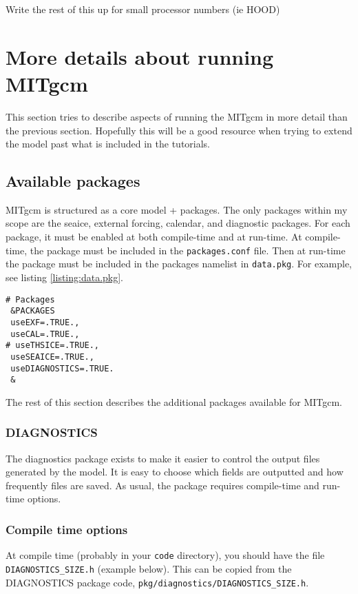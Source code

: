 \documentclass[11pt]{article}
\begin{document}
Write the rest of this up for small processor numbers (ie HOOD)




\section{More details about running MITgcm}
This section tries to describe aspects of running the MITgcm in more detail than the previous section. Hopefully this will be a good resource when trying to extend the model past what is included in the tutorials.

\subsection{Available packages}
MITgcm is structured as a core model + packages. The only packages within my scope are the seaice, external forcing, calendar, and diagnostic packages. For each package, it must be enabled at both compile-time and at run-time. At compile-time, the package must be included in the \verb|packages.conf| file. Then at run-time the package must be included in the packages namelist in \verb|data.pkg|. For example, see listing \ref{listing:data.pkg}.

\begin{lstlisting}[caption={Sample data.pkg file. This would enable the EXF, CAL, SEAICE, and DIAGNOSTICS packages, and disable the THSICE package.}, label={listing:data.pkg}]
# Packages
 &PACKAGES
 useEXF=.TRUE.,
 useCAL=.TRUE.,
# useTHSICE=.TRUE.,
 useSEAICE=.TRUE.,
 useDIAGNOSTICS=.TRUE.
 &
\end{lstlisting}

The rest of this section describes the additional packages available for MITgcm.

\subsubsection{DIAGNOSTICS}
The diagnostics package exists to make it easier to control the output files generated by the model. It is easy to choose which fields are outputted and how frequently files are saved. As usual, the package requires compile-time and run-time options.

\subsubsection*{Compile time options}
At compile time (probably in your \verb|code| directory), you should have the file \verb|DIAGNOSTICS_SIZE.h| (example below). This can be copied from the DIAGNOSTICS package code, \verb|pkg/diagnostics/DIAGNOSTICS_SIZE.h|.
\end{document}
